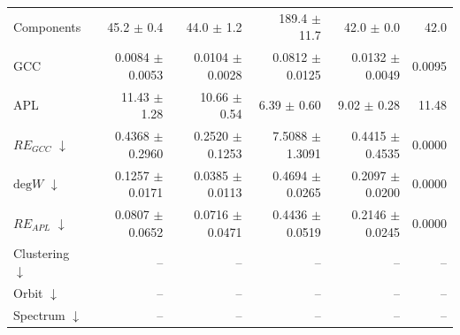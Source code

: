 \begin{table}[H]
\begin{tabular}{lrrrrr}
Components                    & 45.2 $\pm$ 0.4 & 44.0 $\pm$ 1.2 & 189.4 $\pm$ 11.7 & 42.0 $\pm$ 0.0 & 42.0 \\
GCC                           & 0.0084 $\pm$ 0.0053 & 0.0104 $\pm$ 0.0028 & 0.0812 $\pm$ 0.0125 & 0.0132 $\pm$ 0.0049 & 0.0095 \\
APL                           & 11.43 $\pm$ 1.28 & 10.66 $\pm$ 0.54 & 6.39 $\pm$ 0.60 & 9.02 $\pm$ 0.28 & 11.48 \\
\midrule
$RE_{GCC}$ $\downarrow$       & 0.4368 $\pm$ 0.2960 & 0.2520 $\pm$ 0.1253 & 7.5088 $\pm$ 1.3091 & 0.4415 $\pm$ 0.4535 & 0.0000 \\
$\mathrm{deg}W$ $\downarrow$  & 0.1257 $\pm$ 0.0171 & 0.0385 $\pm$ 0.0113 & 0.4694 $\pm$ 0.0265 & 0.2097 $\pm$ 0.0200 & 0.0000 \\
$RE_{APL}$ $\downarrow$       & 0.0807 $\pm$ 0.0652 & 0.0716 $\pm$ 0.0471 & 0.4436 $\pm$ 0.0519 & 0.2146 $\pm$ 0.0245 & 0.0000 \\
Clustering $\downarrow$       & -- & -- & -- & -- & -- \\
Orbit $\downarrow$            & -- & -- & -- & -- & -- \\
Spectrum $\downarrow$         & -- & -- & -- & -- & -- \\
\bottomrule
\end{tabular}
\end{table}
